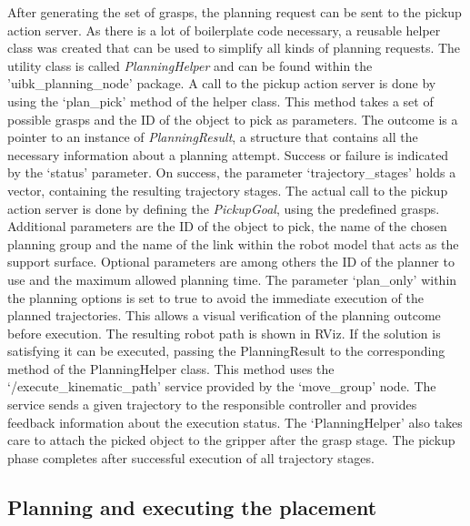 After generating the set of grasps, the planning request can be sent to the pickup action server. As there is a lot of boilerplate code necessary, a reusable helper class was created that can be used to simplify all kinds of planning requests. The utility class is called \emph{PlanningHelper} and can be found within the 'uibk\_planning\_node' package. A call to the pickup action server is done by using the `plan\_pick' method of the helper class. This method takes a set of possible grasps and the ID of the object to pick as parameters. The outcome is a pointer to an instance of \emph{PlanningResult}, a structure that contains all the necessary information about a planning attempt. Success or failure is indicated by the `status' parameter. On success, the parameter `trajectory\_stages' holds a vector, containing the resulting trajectory stages. The actual call to the pickup action server is done by defining the  \emph{PickupGoal}, using the predefined grasps. Additional parameters are the ID of the object to pick, the name of the chosen planning group and the name of the link within the robot model that acts as the support surface. Optional parameters are among others the ID of the planner to use and the maximum allowed planning time. The parameter `plan\_only' within the planning options is set to true to avoid the immediate execution of the planned trajectories. This allows a visual verification of the planning outcome before execution. The resulting robot path is shown in RViz. If the solution is satisfying it can be executed, passing the PlanningResult to the corresponding method of the PlanningHelper class. This method uses the `/execute\_kinematic\_path' service provided by the `move\_group' node. The service sends a given trajectory to the responsible controller and provides feedback information about the execution status. The `PlanningHelper' also takes care to attach the picked object to the gripper after the grasp stage. The pickup phase completes after successful execution of all trajectory stages.


\subsection{Planning and executing the placement}

